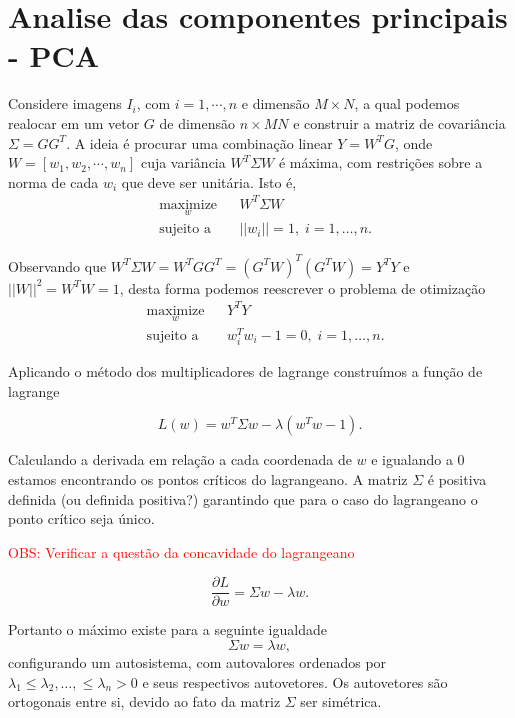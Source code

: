 \section{Analise das componentes principais - PCA}
Considere imagens $I_i$, com $i=1,\cdots,n$ e dimensão $M\times N$, a qual podemos realocar em um vetor $G$ de dimensão $n \times MN$ e construir a matriz de covariância $\Sigma=GG^T$. A ideia é procurar uma combinação linear $Y=W^TG$, onde $W=\left[w_1,w_2,\cdots,w_n\right]$ cuja variância $W^T\Sigma W$ é máxima, com restrições sobre a norma de cada $w_i$ que deve ser unitária. Isto é,
\begin{equation*}
\begin{aligned}
& \underset{w}{\text{maximize}}
& & W^T\Sigma W \\
& \text{sujeito a}
& & ||w_i|| = 1, \; i = 1, \ldots, n.
\end{aligned}
\end{equation*}

Observando que $W^T\Sigma W=W^TGG^T=(G^TW)^T(G^TW)=Y^TY$ e $||W||^2=W^TW=1$, desta forma podemos reescrever o problema de otimização 
\begin{equation*}
\begin{aligned}
& \underset{w}{\text{maximize}}
& & Y^TY \\
& \text{sujeito a}
& & w_i^Tw_i - 1 = 0, \; i = 1, \ldots, n.
\end{aligned}
\end{equation*}

Aplicando o método dos multiplicadores de lagrange construímos a função de lagrange

\begin{equation}\label{cap_fusao_68}
	L(w)= w^T\Sigma w -\lambda(w^Tw - 1).
\end{equation}

Calculando a derivada em relação a cada coordenada de $w$ e igualando a $0$ estamos encontrando os pontos críticos do lagrangeano. A matriz $\Sigma$ é positiva definida (ou definida positiva?) garantindo que para o caso do lagrangeano o ponto crítico seja único.

\textcolor{red}{OBS: Verificar a questão da concavidade do lagrangeano}

\begin{equation}\label{cap_fusao_69}
\frac{\partial L}{\partial w}= \Sigma w -\lambda w .
\end{equation}

Portanto o máximo existe para a seguinte igualdade
\begin{equation}\label{cap_fusao_70}
\Sigma w =\lambda w,
\end{equation}
configurando um autosistema, com autovalores ordenados por $\lambda_1\leq\lambda_2,\ldots,\leq\lambda_n>0$ e seus respectivos autovetores. Os autovetores são ortogonais entre si, devido ao fato da matriz $\Sigma$ ser simétrica.

